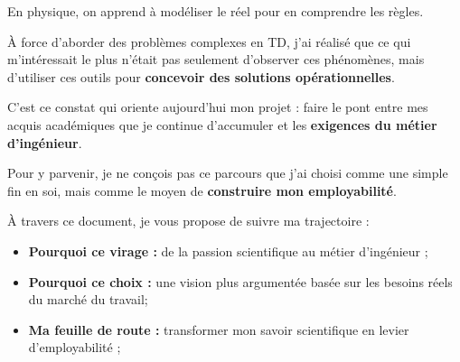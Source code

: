En physique, 
on apprend à modéliser le réel pour en comprendre les règles. 

À force d'aborder des problèmes complexes en TD, 
j'ai réalisé que ce qui m'intéressait le plus n'était pas seulement d'observer ces phénomènes, 
mais d'utiliser ces outils pour \textbf{concevoir des solutions opérationnelles}. 

C'est ce constat qui oriente aujourd'hui mon projet : 
faire le pont entre mes acquis académiques que je continue d'accumuler
et les \textbf{exigences du métier d'ingénieur}. 

Pour y parvenir, 
je ne conçois pas ce parcours que j'ai choisi comme une simple fin en soi, 
mais comme le moyen de \textbf{construire mon employabilité}. 

À travers ce document, 
je vous propose de suivre ma trajectoire : 
\begin{itemize}
    \item \textbf{Pourquoi ce virage :} de la passion scientifique au métier d'ingénieur ;
    \item \textbf{Pourquoi ce choix :} une vision plus argumentée basée sur les besoins réels du marché du travail;
    \item \textbf{Ma feuille de route :} transformer mon savoir scientifique en levier d'employabilité ;
\end{itemize}
